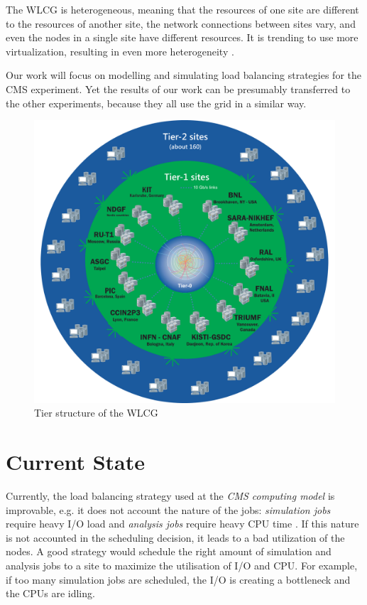 The WLCG is heterogeneous, meaning that the resources of one site are different to the resources of another site, the network connections between sites vary, and even the nodes in a single site have different resources. It is trending to use more virtualization, resulting in even more heterogeneity \cite{wlcg_update}.

Our work will focus on modelling and simulating load balancing strategies for the CMS experiment. Yet the results of our work can be presumably transferred to the other experiments, because they all use the grid in a similar way.

	\begin{figure}[t!]
		\centering
		\includegraphics[width=1.0\linewidth]{images/WLCG}
		\caption[]{Tier structure of the WLCG \cite{wlcg_tiers}}
		\label{fig:wlcg}
	\end{figure}
	

\section{Current State}
Currently, the load balancing strategy used at the \textit{CMS computing model} is improvable, e.g. it does not account the nature of the jobs: \textit{simulation jobs} require heavy I/O load and \textit{analysis jobs} require heavy CPU time \cite{1742-6596-331-7-072038}. If this nature is not accounted in the scheduling decision, it leads to a bad utilization of the nodes. A good strategy would schedule the right amount of simulation and analysis jobs to a site to maximize the utilisation of I/O and CPU. For example, if too many simulation jobs are scheduled, the I/O is creating a bottleneck and the CPUs are idling. 


